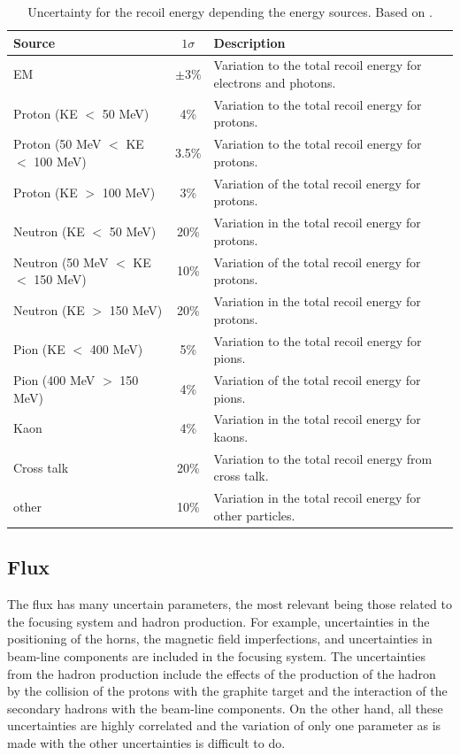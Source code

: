 \begin{table}[!htb]
    \centering
    \begin{tabular}{p{1.5in}|c|p{3in}}
        \hline 
        Source & $1\sigma$ & Description \\
        \hline  
        EM & $\pm3\%$ & Variation to the total recoil energy for electrons and photons.\\ \hline
        Proton (KE $<$ 50 MeV) & 4\% & Variation to the total recoil energy for protons. \\ \hline
        Proton (50 MeV $<$ KE $<$ 100 MeV) & 3.5\% & Variation to the total recoil energy for protons.\\ \hline
        Proton (KE $>$ 100 MeV) & 3\% & Variation of the total recoil energy for protons. \\ \hline
        Neutron (KE $<$ 50 MeV) & 20\% & Variation in the total recoil energy for protons. \\ \hline
        Neutron (50 MeV $<$ KE $<$ 150 MeV) & 10\% & Variation of the total recoil energy for protons. \\ \hline
        Neutron (KE $>$ 150 MeV) & 20\% & Variation in the total recoil energy for protons. \\ \hline
        Pion (KE $<$ 400 MeV) & 5\% & Variation to the total recoil energy for pions. \\ \hline
        Pion (400 MeV $>$ 150 MeV) & 4\% & Variation of the total recoil energy for pions. \\ \hline
        Kaon & 4\% & Variation in the total recoil energy for kaons. \\ \hline
        Cross talk & 20\% & Variation to the total recoil energy from cross talk. \\ \hline
        other & 10\% & Variation in the total recoil energy for other particles. \\ \hline
    \end{tabular}
    \caption{Uncertainty for the recoil energy depending the energy sources. Based on \cite{BenThesis}.}
    \label{tab:ErrorAnalysis:SystematicUnc:dEdx}
\end{table}

\pagebreak


\subsection{Flux}
\label{Cap:ErrorAnalysis:SystematicUnc:Flux}

The flux has many uncertain parameters, the most relevant being those related to the focusing system and hadron production. For example, uncertainties in the positioning of the horns, the magnetic field imperfections, and uncertainties in beam-line components are included in the focusing system. The uncertainties from the hadron production include the effects of the production of the hadron by the collision of the protons with the graphite target and the interaction of the secondary hadrons with the beam-line components. On the other hand, all these uncertainties are highly correlated and the variation of only one parameter as is made with the other uncertainties is difficult to do. 

